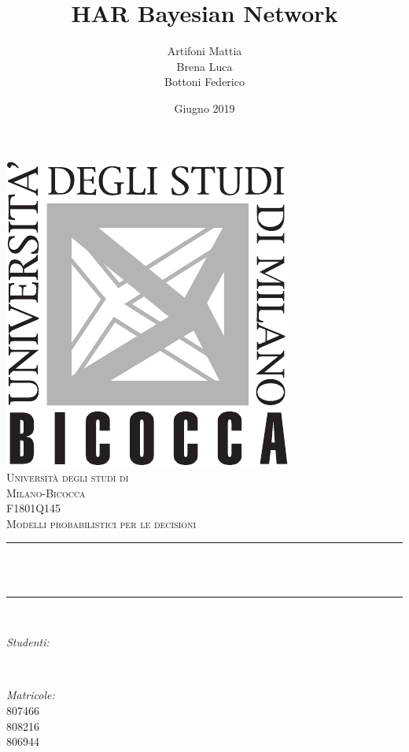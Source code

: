 \documentclass[12pt]{article}
\title{HAR Bayesian Network}								%
\author{Artifoni Mattia \\ Brena Luca \\ Bottoni Federico}								%
\date{Giugno 2019}											%
\makeatletter
\let\thetitle\@title
\let\theauthor\@author
\let\thedate\@date
\makeatother
\begin{document}

\begin{titlepage}
	\centering
    \vspace*{0.5 cm}
    \includegraphics[scale = 0.75]{images/LogoBicocca.pdf}\\[1.0 cm]	%
    \textsc{\LARGE Università degli studi di}\\[0.2 cm]
    \textsc{\LARGE Milano-Bicocca}\\[2.0 cm]	%
	\textsc{\Large F1801Q145}\\[0.5 cm]				%
	\textsc{\large Modelli probabilistici per le decisioni}\\[0.5 cm]				%
	\rule{\linewidth}{0.2 mm} \\[0.4 cm]
	{ \huge \bfseries \thetitle}\\
	\rule{\linewidth}{0.2 mm} \\[1.5 cm]

	\begin{minipage}{0.4\textwidth}
		\begin{flushleft} \large
			\emph{Studenti:}\\
			\theauthor
			\end{flushleft}
			\end{minipage}~
			\begin{minipage}{0.4\textwidth}
			\begin{flushright} \large
			\emph{Matricole:} \\
			807466 \\ 808216 \\ 806944
		\end{flushright}
	\end{minipage}\\[2 cm]

	{\large \thedate}\\[2 cm]

	\vfill

\end{titlepage}
\end{document}

